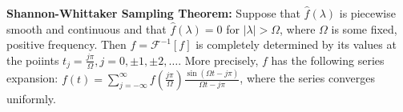 {\bf Shannon-Whittaker Sampling Theorem:} Suppose that $\hat{f}(\lambda)$ is piecewise smooth and continuous and that $\hat{f}(\lambda)=0$ for $|\lambda|>\Omega$, where $\Omega$ is some fixed, positive frequency. Then $f=\mathcal{F}^{-1}[f]$ is completely determined by its values at the poiints $t_j=\frac{j\pi}{\Omega}, j=0,\pm 1,\pm 2,\dots$. More precisely, $f$ has the following series expansion: $f(t)=\sum_{j=-\infty}^{\infty}f\left(\frac{j\pi}{\Omega}\right)\frac{\sin(\Omega t-j\pi)}{\Omega t-j\pi}$, where the series converges uniformly.